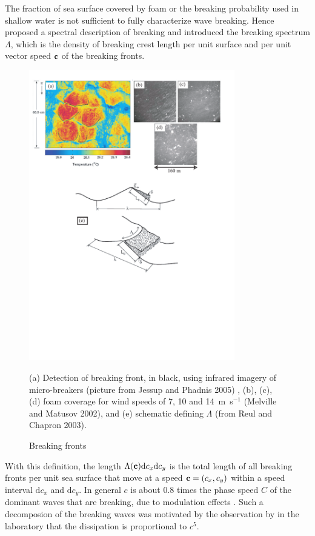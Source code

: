 The fraction of sea surface 
covered by foam or the breaking probability used in shallow water is not sufficient to fully characterize wave breaking. 
Hence \cite{Phillips1985} proposed a spectral 
description of breaking and introduced the breaking spectrum 
$\Lambda$, which is the density of breaking crest length per unit surface and per unit vector speed $\mathbf{c}$ of the breaking fronts. 
\begin{figure}[htb]
\centerline{\includegraphics[width=0.8\textwidth]{FIGS_CH_SOURCETERMS/breaking_lambda.pdf}}
\caption{Breaking fronts}{(a) Detection of breaking front, in black, using infrared imagery of micro-breakers  (picture from 
Jessup and Phadnis 2005\nocite{Jessup&Phadnis2005}) , (b), (c), (d) foam coverage for wind speeds of 7, 10 and 14~m~s$^{-1}$
(Melville and Matusov 2002\nocite{Melville&Matusov2002}), and (e)
schematic defining $\Lambda$ (from Reul and  Chapron 2003\nocite{Reul&Chapron2003}).}\label{figlambda}
\end{figure}
With this definition, the length  $\Lambda (\mathbf{c}) {\mathrm d}c_x {\mathrm d}c_y$
is the total length of all breaking fronts per unit sea surface that move at a speed  $\mathbf{c}=(c_x,c_y)$ within a speed interval 
${\mathrm d}c_x$ and ${\mathrm
d}c_y$. In general $c$ is about 0.8 times the phase speed $C$ of the dominant waves that are breaking, 
due to modulation effects \citep{Banner&al.2014}. Such a decomposion of the breaking 
waves was motivated by the observation by \cite{Duncan1981,Duncan1983} in the laboratory 
that the dissipation is proportional to $c^5$. 


